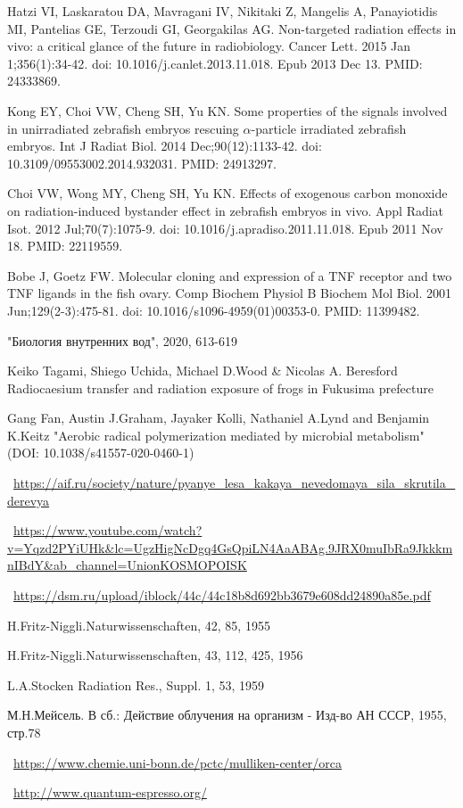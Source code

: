 \documentclass[11pt]{article}
\begin{document}
\begin{thebibliography}{3}
Hatzi VI, Laskaratou DA, Mavragani IV, Nikitaki Z, Mangelis A, Panayiotidis MI, Pantelias GE, Terzoudi GI, Georgakilas AG. Non-targeted radiation effects in vivo: a critical glance of the future in radiobiology. Cancer Lett. 2015 Jan 1;356(1):34-42. doi: 10.1016/j.canlet.2013.11.018. Epub 2013 Dec 13. PMID: 24333869.

Kong EY, Choi VW, Cheng SH, Yu KN. Some properties of the signals involved in unirradiated zebrafish embryos rescuing $\alpha$-particle irradiated zebrafish embryos. Int J Radiat Biol. 2014 Dec;90(12):1133-42. doi: 10.3109/09553002.2014.932031. PMID: 24913297.

Choi VW, Wong MY, Cheng SH, Yu KN. Effects of exogenous carbon monoxide on radiation-induced bystander effect in zebrafish embryos in vivo. Appl Radiat Isot. 2012 Jul;70(7):1075-9. doi: 10.1016/j.apradiso.2011.11.018. Epub 2011 Nov 18. PMID: 22119559.

Bobe J, Goetz FW. Molecular cloning and expression of a TNF receptor and two TNF ligands in the fish ovary. Comp Biochem Physiol B Biochem Mol Biol. 2001 Jun;129(2-3):475-81. doi: 10.1016/s1096-4959(01)00353-0. PMID: 11399482.

"Биология внутренних вод", 2020, 613-619 

Keiko Tagami, Shiego Uchida, Michael D.Wood \& Nicolas A. Beresford Radiocaesium transfer and radiation exposure of frogs in Fukusima prefecture

Gang Fan, Austin J.Graham, Jayaker Kolli, Nathaniel A.Lynd and Benjamin K.Keitz "Aerobic radical polymerization mediated by microbial metabolism" (DOI: 10.1038/s41557-020-0460-1) 
 
~\url{https://aif.ru/society/nature/pyanye_lesa_kakaya_nevedomaya_sila_skrutila_derevya}
 
~\url{https://www.youtube.com/watch?v=Yqzd2PYiUHk&lc=UgzHigNcDgq4GsQpiLN4AaABAg.9JRX0muIbRa9JkkkmnIBdY&ab_channel=UnionKOSMOPOISK}


~\url{https://dsm.ru/upload/iblock/44c/44c18b8d692bb3679e608dd24890a85e.pdf}

H.Fritz-Niggli.Naturwissenschaften, 42, 85, 1955 

H.Fritz-Niggli.Naturwissenschaften, 43, 112, 425, 1956

L.A.Stocken Radiation Res., Suppl. 1, 53, 1959

М.Н.Мейсель. В сб.: Действие облучения на организм - Изд-во АН СССР, 1955, стр.78

~\url{https://www.chemie.uni-bonn.de/pctc/mulliken-center/orca}

~\url{http://www.quantum-espresso.org/}

\end{thebibliography}
\end{document}
